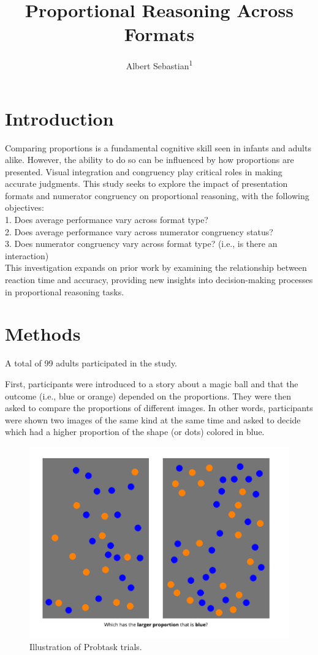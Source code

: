 \documentclass[
  man,floatsintext]{apa6}
\title{Proportional Reasoning Across Formats}
\author{Albert Sebastian\textsuperscript{1}}
\date{}
\affiliation{\vspace{0.5cm}\textsuperscript{1} Rutgers University}
\begin{document}
\maketitle

\section{Introduction}\label{introduction}

Comparing proportions is a fundamental cognitive skill seen in infants and adults alike. However, the ability to do so can be influenced by how proportions are presented. Visual integration and congruency play critical roles in making accurate judgments. This study seeks to explore the impact of presentation formats and numerator congruency on proportional reasoning, with the following objectives:\\
1. Does average performance vary across format type?\\
2. Does average performance vary across numerator congruency status?\\
3. Does numerator congruency vary across format type? (i.e., is there an interaction)\\
This investigation expands on prior work by examining the relationship between reaction time and accuracy, providing new insights into decision-making processes in proportional reasoning tasks.

\section{Methods}\label{methods}

A total of 99 adults participated in the study.

First, participants were introduced to a story about a magic ball and that the outcome (i.e., blue or orange) depended on the proportions. They were then asked to compare the proportions of different images. In other words, participants were shown two images of the same kind at the same time and asked to decide which had a higher proportion of the shape (or dots) colored in blue.

\begin{figure}[H]
  \centering
  \includegraphics[width=0.5\linewidth]{images_WA10/Probtask_Trial.png}
  \caption{Illustration of Probtask trials.}
  \label{fig:probtask-trial}
\end{figure}
\end{document}
